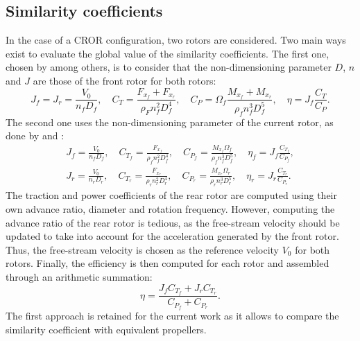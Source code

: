 \subsection{Similarity coefficients}
\label{sub:cror_similarity_coeff}

In the case of a CROR configuration, two rotors are considered.
Two main ways exist to evaluate the global value of the
similarity coefficients. The first one, chosen by
\citet{Bechet2011} among others, is to consider
that the non-dimensioning parameter $D$, $n$ and $J$ are those
of the front rotor for both rotors:
\begin{equation}
    J_f = J_r = \frac{V_0}{n_f D_f}, \quad
    C_T = \frac{F_{x_f} + F_{x_r}}{\rho_F n_f ^ 2  D_f ^ 4}, \quad
    C_P = \Omega_f \frac{M_{x_f} + M_{x_r}}{\rho_f n_f ^ 3 D_f ^ 5}, \quad
    \eta = J_f \frac{C_T}{C_P}.
\end{equation} 
The second one uses the non-dimensioning parameter of the current rotor,
as done by \citet{Stuermer2008} and \citet{Zachariadis2011}:
\begin{equation}
    \begin{split}
        J_f = \frac{V_0}{n_f D_f}, \quad
        C_{T_f} = \frac{F_{x_f}}{\rho_f n_f ^ 2  D_f ^ 4}, \quad
        C_{P_f} = \frac{M_{x_f}\Omega_f}{\rho_f n_f ^ 3 D_f ^ 5}, \quad
        \eta_f = J_f \frac{C_{T_f}}{C_{P_f}}, \\
        J_r = \frac{V_0}{n_r D_r}, \quad
        C_{T_r} = \frac{F_{x_r}}{\rho_r n_r ^ 2  D_r ^ 4}, \quad
        C_{P_r} = \frac{M_{x_r}\Omega_r}{\rho_r n_r ^ 3 D_r ^ 5}, \quad
        \eta_r = J_r \frac{C_{T_r}}{C_{P_r}}.
    \end{split}
\end{equation} 
The traction and power coefficients of the rear rotor are
computed using their own advance ratio, diameter and rotation frequency.
However, computing the advance ratio of the rear rotor is tedious, as
the free-stream velocity should be updated to take into account
for the acceleration generated by the front rotor. Thus, the free-stream
velocity is chosen as the reference velocity $V_0$ for both rotors.
Finally, the efficiency is then computed for each rotor and
assembled through an arithmetic summation:
\begin{equation}
    \eta = \frac{J_f C_{T_f} + J_r C_{T_r}}{C_{P_f} + C_{P_r}}.
\end{equation}
The first approach is retained for the current work as it allows
to compare the similarity coefficient with equivalent propellers.
